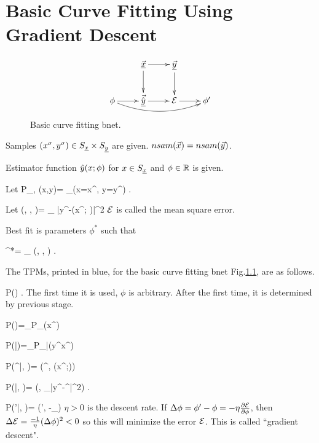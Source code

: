 \chapter{Basic Curve Fitting
Using Gradient Descent}
\label{ch-basic-fit}

\begin{figure}[h!]
\centering
$$\xymatrix{
&\vec{\rvx}\ar[d]\ar[r]&\ul{\vecy}
\ar[d]&\\
\phi\ar[r]\ar@/_1pc/[rrr]&
\vec{\hat{\rvy}}\ar[r]&\cale\ar[r]&\phi'
}$$
\caption{Basic curve fitting bnet.}
\label{fig-bfit}
\end{figure}


Samples 
$(x^\sigma, y^\sigma)\in S_{\underline{x}}\times S_{\underline{y}}$
are given. $nsam({\vec{x}})=nsam({\vec{y}})$.

Estimator function 
${\hat{y}}(x; \phi)$
for $x\in S_{\underline{x}}$ and $\phi\in{ \mathbb{R}}$
is given.

Let 
\beq
P_{\rvx, \rvy}(x,y)=
\sum_\s \indi(x=x^\s, y=y^\s)
\;.
\eeq


Let 
\beq
\cale(\vecx, \vecy, \phi)=
\sum_\s
|y^\s-\haty(x^\s; \phi)|^2
\;
\eeq
${\cal E}$ is called the mean square error.

Best fit is parameters $\phi^*$
such that

\beq 
\phi^*= \argmin_\phi
\cale(\vecx, \vecy, \phi)
\;.
\eeq

The TPMs, printed in blue, for
the basic curve fitting bnet
 Fig.\ref{fig-bfit}, are
as follows.

\beq\color{blue}
P(\phi) 
\;.
\eeq
The first time
it is used, $\phi$ is arbitrary.
After the first time, it is determined 
by previous stage.

\beq\color{blue}
P(\vecx)=\prod_\s P_\rvx(x^\s)
\eeq

\beq\color{blue}
P(\vecy|\vecx)=\prod_\s P_{\rvy|\rvx}(y^\s\cond x^\s)
\eeq

\beq\color{blue}
P(\haty^\s|\phi, \vecx)=
\delta(\haty^\s, \haty(x^\s;\phi))
\eeq


\beq\color{blue}
P(\cale|\vec{\haty}, \vecy)=
\delta(\cale,
\sum_\s |y^\s-\haty^\s|^2)
\;.
\eeq


\beq\color{blue}
P(\phi'|\phi, \cale)=
\delta(\phi',
\phi-\eta\partial_\phi\cale)
\eeq
$\eta>0$ is the descent rate.
If $\Delta \phi=\phi'-\phi=-\eta 
\frac{\partial{\cal E}}
{\partial \phi}$, then
 $\Delta {\cal E}=\frac{-1}{\eta}
(\Delta\phi)^2<0$  so this will
minimize the error
${\cal E}$.
This is called ``gradient descent".